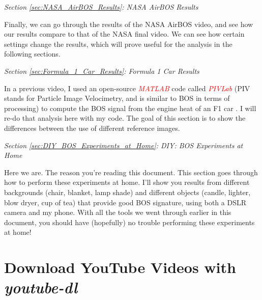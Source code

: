 \documentclass[letterpaper,12pt]{article}
\begin{document}
\vspace{1em}
\noindent \emph{Section \ref{sec:NASA_AirBOS_Results}: NASA AirBOS Results}
\vspace{1em}

Finally, we can go through the results of the NASA AirBOS video, and see how our results compare to that of the NASA final video.  We can see how certain settings change the results, which will prove useful for the analysis in the following sections.

\vspace{1em}
\noindent \emph{Section \ref{sec:Formula_1_Car_Results}: Formula 1 Car Results}
\vspace{1em}

In a previous video, I used an open-source \textcolor{red}{\textit{MATLAB}} code called \textcolor{red}{\textit{PIVLab}} \cite{2014_Thielicke} (PIV stands for Particle Image Velocimetry, and is similar to BOS in terms of processing) to compute the BOS signal from the engine heat of an F1 car \cite{JTE_F1_Car}.  I will re-do that analysis here with my code.  The goal of this section is to show the differences between the use of different reference images.

\vspace{1em}
\noindent \emph{Section \ref{sec:DIY_BOS_Experiments_at_Home}: DIY: BOS Experiments at Home}
\vspace{1em}

Here we are.  The reason you're reading this document.  This section goes through how to perform these experiments at home.  I'll show you results from different backgrounds (chair, blanket, lamp shade) and different objects (candle, lighter, blow dryer, cup of tea) that provide good BOS signature, using both a DSLR camera and my phone.  With all the tools we went through earlier in this document, you should have (hopefully) no trouble performing these experiments at home!

\section{Download YouTube Videos with \textit{youtube-dl}}
\label{sec:YOUTUBE_DL}
\end{document}
